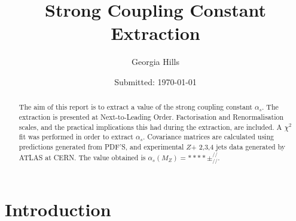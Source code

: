 \documentclass[12pt, onecolumn, nofootinbib]{revtex4}    %
\begin{document}
                     


\title{Strong Coupling Constant Extraction} 
\date{Submitted: \today{}}
\author{Georgia Hills}

\begin{abstract}              
 The aim of this report is to extract a value of the strong coupling constant ${\alpha_s}$. The extraction is presented at Next-to-Leading Order. Factorisation and Renormalisation scales, and the practical implications this had during the extraction, are included. A ${\chi^2}$  fit was performed in order to extract ${\alpha_s}$. Covariance matrices are calculated using predictions generated from PDF'S, and experimental ${Z}$+ 2,3,4 jets data generated by ATLAS at CERN.  The value obtained is ${\alpha_s(M_Z) = **** \pm ^{//}_{//}}$.


\end{abstract}


\maketitle


\tableofcontents

\newpage


\section{Introduction} \label{intro}
\end{document}
